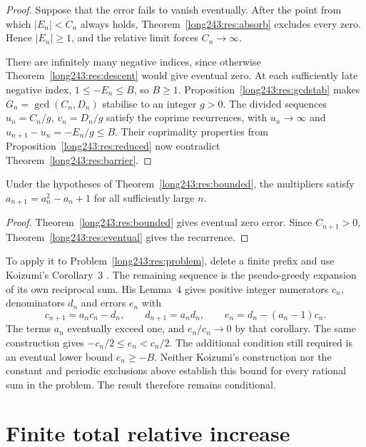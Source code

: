 \documentclass[11pt]{article}
\begin{document}
\begin{proof}
Suppose that the error fails to vanish eventually. After the
point from which $|E_n|<C_n$ always holds, Theorem~\ref{long243:res:absorb} excludes every zero. Hence $|E_n|\ge1$,
and the relative limit forces $C_n\to\infty$.

There are infinitely many negative indices, since otherwise
Theorem~\ref{long243:res:descent} would give eventual zero.
At each sufficiently late negative index, $1\le-E_n\le B$, so
$B\ge1$.
Proposition~\ref{long243:res:gcdstab} makes $G_n=\gcd(C_n,D_n)$
stabilise to an integer $g>0$. The divided sequences
$u_n=C_n/g$, $v_n=D_n/g$ satisfy the coprime recurrences, with
$u_n\to\infty$ and $u_{n+1}-u_n=-E_n/g\le B$.
Their coprimality properties from Proposition~\ref{long243:res:reduced}
now contradict Theorem~\ref{long243:res:barrier}.
\end{proof}

\begin{corollary}\label{long243:res:cor}
Under the hypotheses of Theorem~\ref{long243:res:bounded}, the multipliers
satisfy $a_{n+1}=a_n^{2}-a_n+1$ for all sufficiently large $n$.
\end{corollary}

\begin{proof}
Theorem~\ref{long243:res:bounded} gives eventual zero error. Since
$C_{n+1}>0$, Theorem~\ref{long243:res:eventual} gives the recurrence.
\end{proof}

To apply it to Problem~\ref{long243:res:problem}, delete a finite prefix
and use Koizumi's Corollary~3 \cite[p.~9]{koizumi2025}. The remaining
sequence is the pseudo-greedy expansion of its own reciprocal sum.
His Lemma~4 gives positive integer numerators $c_n$, denominators $d_n$
and errors $e_n$ with
\[
 c_{n+1}=a_nc_n-d_n,\qquad d_{n+1}=a_nd_n,\qquad
 e_n=d_n-(a_n-1)c_n.
\]
The terms $a_n$ eventually exceed one, and $e_n/c_n\to0$ by that
corollary. The same construction gives $-c_n/2\le e_n<c_n/2$.
The additional condition still required is an eventual lower bound
$e_n\ge-B$. Neither Koizumi's construction nor the constant and periodic
exclusions above establish this bound for every rational sum in the
problem. The result therefore remains conditional.

\section{Finite total relative increase}\label{long243:sec:mass}
\end{document}
